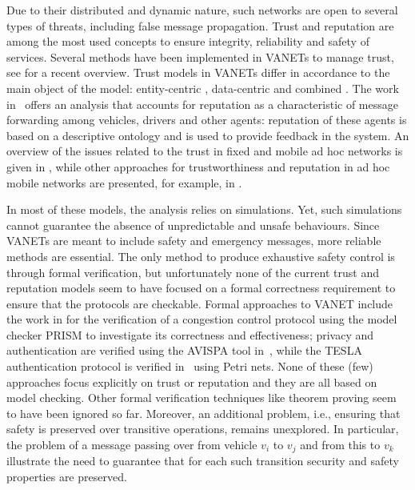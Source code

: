 \documentclass[compsoc, conference, letterpaper, 10pt, times]{IEEEtran}
\begin{document}
Due to their distributed and dynamic nature, such networks are open to several types of threats, including false message propagation. Trust and reputation are among the  most used concepts to ensure integrity, reliability and safety of services. Several methods have been implemented in VANETs to manage trust, see \cite{Soleymani2015} for a recent overview. Trust models in VANETs differ in accordance to the main object of the model: entity-centric \cite{5641621, GomezMarmol:2012:TTR:2160992.2161100}, data-centric \cite{conf/infocom/RayaPGH08, Lo2009} and combined \cite{Wei2012}. The work in~\cite{glenford} offers an analysis that accounts for reputation as a characteristic of message forwarding among vehicles, drivers and other agents: reputation of these agents is based on a descriptive ontology and is used to provide feedback in the system. An overview of the issues related to the trust in fixed and mobile ad hoc networks is given in \cite{DBLP:conf/vtc/WexBHLD08}, while other approaches for trustworthiness and reputation in ad hoc mobile networks are presented, for example, in \cite{DBLP:conf/um/FinnsonZTMC12, DBLP:journals/ijaisc/ChaurasiaTV15}.

In most of these models, the analysis relies on simulations. Yet, such
simulations cannot guarantee the absence of unpredictable and unsafe
behaviours. Since VANETs are meant to include safety and emergency messages,
more reliable methods are essential. The only method to produce exhaustive
safety control is through formal verification, but unfortunately none of the
current trust and reputation models seem to have focused on a formal
correctness requirement to ensure that the protocols are checkable. Formal
approaches to VANET include the work in \cite{DBLP:conf/vtc/KonurF11} for
the verification of a congestion control protocol using the model checker PRISM to investigate its correctness and effectiveness; privacy and authentication are verified using the AVISPA tool in~\cite{bouassida2011authentication}, while the TESLA authentication protocol is verified in~\cite{tesla-cpn} using Petri nets.  None of these (few) approaches focus explicitly on trust or reputation and they are all based on model checking. Other formal verification techniques like theorem proving seem to have been ignored so far. Moreover, an additional problem, i.e., ensuring that safety is preserved over transitive operations, remains unexplored. In particular, the problem of a message passing over from vehicle $v_{i}$ to $v_{j}$ and from this to $v_{k}$ illustrate the need to guarantee that for each such transition security and safety properties are preserved.
\end{document}
